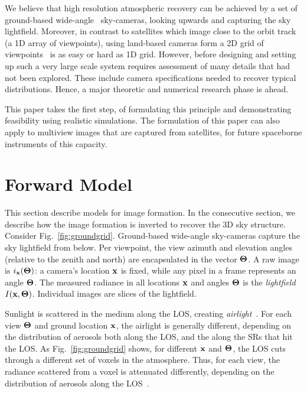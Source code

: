 \documentclass[10pt,twocolumn,letterpaper]{article}
\begin{document}
We believe that high resolution atmospheric recovery can be achieved by a set of ground-based wide-angle~\cite{oliver, Peleg, kopal} sky-cameras, looking upwards and capturing the sky lightfield.
Moreover, in contrast to satellites which image close to the orbit track (a 1D array of viewpoints), using land-based cameras form a 2D grid of viewpoints~\cite{Snavely, Joshi} is
 as easy or hard as 1D grid. However, before designing and setting up such a very large scale system requires assessment of many details that had not been explored. These include camera specifications needed to recover typical distributions. Hence, a major theoretic and numerical research phase is ahead.

This paper takes the first step, of formulating this principle and demonstrating feasibility using realistic simulations. The formulation of this paper can also apply to multiview images that are captured from satellites, for future spaceborne instruments of this capacity.


\section{Forward Model}
\label{sec:skymodel} \vspace{-0.2cm}

This section describe models for image formation. In the consecutive section, we describe how the image formation is inverted to recover the 3D sky structure.
Consider Fig.~\ref{fig:groundgrid}.
Ground-based wide-angle sky-cameras capture the sky lightfield from below. Per viewpoint, the view azimuth and elevation angles (relative to the zenith and north) are encapsulated in the vector ${\bf{\Theta}}$.  A raw image is $i_{\bf x}({\bf{\Theta}})$: a camera's location ${\bf x}$ is fixed, while any pixel in a frame represents an angle ${\bf{\Theta}}$.
The measured radiance in all locations ${\bf x}$ and angles ${\bf{\Theta}}$ is the {\em lightfield} $I({\bf x},{\bf{\Theta}})$. Individual images are slices of the lightfield.

Sunlight is scattered in the medium along the LOS, creating {\em airlight}~\cite{fattal,narasimhan2,Hschechner2,tan}. For each view ${\bf{\Theta}}$ and ground location ${\bf x}$, the airlight is generally different, depending on the distribution of aerosols both along the LOS, and the along the SRs that hit the LOS.
As Fig.~\ref{fig:groundgrid} shows, for different ${\bf x}$ and ${\bf{\Theta}}$, the LOS cuts through a different set of voxels in the atmosphere. Thus, for each view, the radiance scattered from a voxel is attenuated differently, depending on the distribution of aerosols along the LOS~\cite{hansen}.
\end{document}
